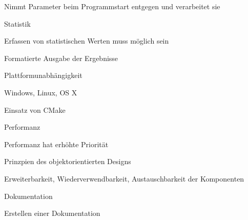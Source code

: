 \begin{compactenum}[a)]
\begin{compactenum}[1.]
			\item Nimmt Parameter beim Programmstart entgegen und verarbeitet sie \label{FA:Konsolenanwendung:Parameter}
		\end{compactenum}
	\item Statistik \label{FA:Statistik}
		\begin{compactenum}[1.]
			\item Erfassen von statistischen Werten muss möglich sein \label{FA:Statistik:Erfassen}
			\item Formatierte Ausgabe der Ergebnisse \label{FA:Statistik:Ausgabe}
		\end{compactenum}


	\item Plattformunabhängigkeit \label{NFA:Plattformunabhängigkeit}
		\begin{compactenum}[1.]
			\item Windows, Linux, OS X \label{NFA:Plattformunabhängigkeit:BS}
			\item Einsatz von CMake \label{NFA:Plattformunabhängigkeit:CMake}
		\end{compactenum}
		\item Performanz \label{NFA:Performanz}
		\begin{compactenum}[1.]
			\item Performanz hat erhöhte Priorität \label{NFA:Performanz:Priorität}
		\end{compactenum}
		\item Prinzpien des objektorientierten Designs \label{NFA:Softwarearchitektur}
		\begin{compactenum}[1.]
			\item Erweiterbarkeit, Wiederverwendbarkeit, Austauschbarkeit der Komponenten \label{NFA:Softwarearchitektur:Eigenschaften}
		\end{compactenum}
		\item Dokumentation \label{NFA:Dokumentation}
		\begin{compactenum}[1.]
			\item Erstellen einer Dokumentation \label{NFA:Dokumentation:Erstellen}
		\end{compactenum}
\end{compactenum}

